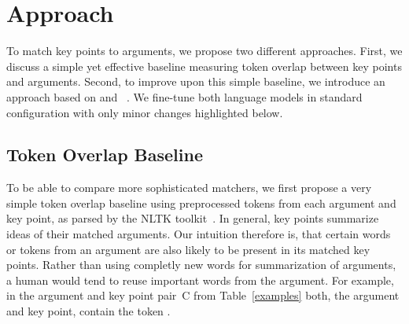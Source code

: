 \section{Approach}\label{approach}

To match key points to arguments, we propose two different approaches.
First, we discuss a simple yet effective baseline measuring token overlap between key points and arguments.
Second, to improve upon this simple baseline, we introduce an approach based on \Bert and \Roberta~\cite{DevlinCLT2019,LiuOGDJCLLZS2019}. 
We fine-tune both language models in standard configuration with only minor changes highlighted below.

\subsection{Token Overlap Baseline}
To be able to compare more sophisticated matchers, we first propose a very simple token overlap baseline using preprocessed tokens 
from each argument and key point, as parsed by the NLTK toolkit~\cite{BirdL2004}. 
In general, key points summarize ideas of their matched arguments.
Our intuition therefore is, that certain words or tokens from an argument are also likely to be present in its matched key points.
Rather than using completly new words for summarization of arguments, a human would tend to reuse important words from the argument.
For example, in the argument and key point pair~C from Table~\ref{examples} both, the argument and key point, contain the token .


